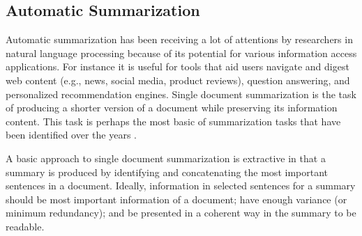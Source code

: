 
\subsection{Automatic Summarization}
\label{subsec:automatic_summarization}
%
Automatic summarization has been receiving a lot of attentions by researchers in natural language processing because of its potential for various information access applications. 
For instance it is useful for tools that aid users navigate and digest web content (e.g., news, social media, product reviews), question answering, and personalized recommendation engines. 
Single document summarization is the task of producing a shorter version of a document while preserving its information content. 
This task is perhaps the most basic of summarization tasks that have been identified over the years \cite{nenkova11}. 

A basic approach to single document summarization is extractive in that a summary is produced by identifying and concatenating the most important sentences in a document. 
Ideally, information in selected sentences for a summary should be most important information of a document; have enough variance (or minimum redundancy); and be presented in a coherent way in the summary to be readable. 

